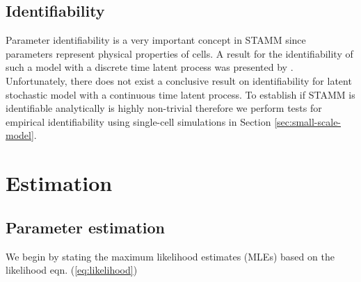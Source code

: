 \subsection{Identifiability}
\label{sec:identifiability}

Parameter identifiability is a very important concept in STAMM since parameters represent physical properties of cells. A result for the identifiability of such a model with a discrete time latent process was presented by \cite{Clifford:1977wa}. Unfortunately, there does not exist a conclusive result on identifiability for latent stochastic model with a continuous time latent process. To establish if STAMM is identifiable analytically is highly non-trivial therefore we perform tests for empirical identifiability using single-cell simulations in Section \ref{sec:small-scale-model}.

\section{Estimation}
\label{sec:estimation}

\subsection{Parameter estimation}
\label{sec:parameter-estimation}

We begin by stating the maximum likelihood estimates (MLEs) based on the likelihood eqn. (\ref{eq:likelihood})

